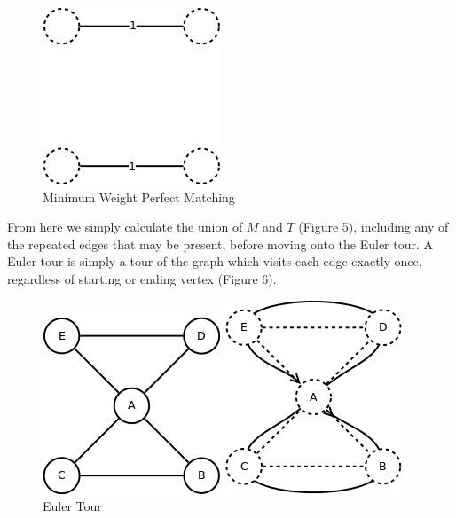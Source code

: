 \documentclass[11pt,a4paper,titlepage]{article}
\begin{document}
\begin{figure}[ht]
	\includegraphics[scale=0.6]{WikiMinMatch}
	\centering
	\caption{Minimum Weight Perfect Matching}
\end{figure}

From here we simply calculate the union of $M$ and $T$ (Figure 5), including any of the repeated edges that may be present, before moving onto the Euler tour. A Euler tour is simply a tour of the graph which visits each edge exactly once, regardless of starting or ending vertex (Figure 6).

\begin{figure}[ht]
	\centering
		\begin{minipage}{0.45\textwidth}
			\centering
			\includegraphics[scale=0.5]{WikiComb}
			\caption{$M \bigcup T$}
		\end{minipage}\hfill
		\begin{minipage}{0.45\textwidth}
			\centering
			\includegraphics[scale=0.5]{WikiEulerTour}
			\caption{Euler Tour}
		\end{minipage}\hfill
\end{figure}
\end{document}
